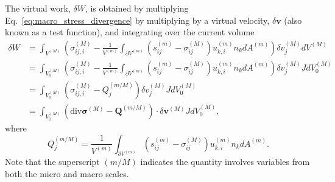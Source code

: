 The virtual work, $\delta W$, is obtained by multiplying Eq.\ \eqref{eq:macro_stress_divergence} by multiplying by a virtual velocity, $\delta \pmb{v}$ (also known as a test function), and integrating over the current volume \cite{JavierBonet:2008uxa}
%
\begin{align}
\delta W &= \int_{V^{(M)}} \left(\sigma_{ij,i}^{(M)} - \frac{1}{V^{(m)}} \int_{\partial V^{(m)}} \left( s_{ij}^{(m)} - \sigma_{ij}^{(M)} \right)u_{k,i}^{(m)} n_k dA^{(m)} \right)  \delta v_j^{(M)}  dV^{(M)} \nonumber\\
%
&= \int_{V_0^{(M)}} \left(\sigma_{ij,i}^{(M)} - \frac{1}{V^{(m)}} \int_{\partial V^{(m)}} \left( s_{ij}^{(m)} - \sigma_{ij}^{(M)} \right)u_{k,i}^{(m)} n_k dA^{(m)} \right)  \delta v_j^{(M)}J dV_0^{(M)}  \nonumber\\
%
&= \int_{V_0^{(M)}} \left(\sigma_{ij,i}^{(M)} - Q_j^{(m/M)} \right) \delta v_j^{(M)}J dV_0^{(M)}   \nonumber\\
%
&= \int_{V_0^{(M)}} \left(\text{div}\pmb{\sigma}^{(M)} - \pmb{Q}^{(m/M)} \right)  \cdot \delta \pmb{v}^{(M)}J dV_0^{(M)} ,
\label{eq:virtual_work}
\end{align}
%
where  
%
\begin{equation}
Q_j^{(m/M)} = \frac{1}{V^{(m)}} \int_{\partial V^{(m)}} \left( s_{ij}^{(m)} - \sigma_{ij}^{(M)} \right)u_{k,i}^{(m)} n_k dA^{(m)}.
\end{equation}
%
Note that the superscript $(m/M)$ indicates the quantity involves variables from both the micro and macro scales. 

